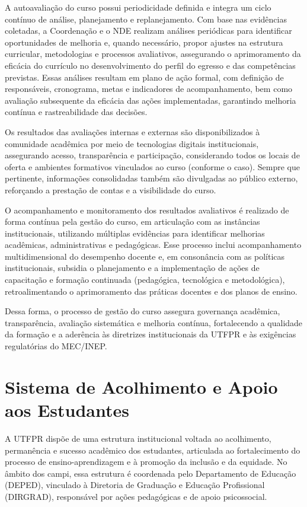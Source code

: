 A autoavaliação do curso possui periodicidade definida e integra um ciclo contínuo de análise, planejamento e replanejamento. Com base nas evidências coletadas, a Coordenação e o NDE realizam análises periódicas para identificar oportunidades de melhoria e, quando necessário, propor ajustes na estrutura curricular, metodologias e processos avaliativos, assegurando o aprimoramento da eficácia do currículo no desenvolvimento do perfil do egresso e das competências previstas. Essas análises resultam em plano de ação formal, com definição de responsáveis, cronograma, metas e indicadores de acompanhamento, bem como avaliação subsequente da eficácia das ações implementadas, garantindo melhoria contínua e rastreabilidade das decisões.

Os resultados das avaliações internas e externas são disponibilizados à comunidade acadêmica por meio de tecnologias digitais institucionais, assegurando acesso, transparência e participação, considerando todos os locais de oferta e ambientes formativos vinculados ao curso (conforme o caso). Sempre que pertinente, informações consolidadas também são divulgadas ao público externo, reforçando a prestação de contas e a visibilidade do curso.

O acompanhamento e monitoramento dos resultados avaliativos é realizado de forma contínua pela gestão do curso, em articulação com as instâncias institucionais, utilizando múltiplas evidências para identificar melhorias acadêmicas, administrativas e pedagógicas. Esse processo inclui acompanhamento multidimensional do desempenho docente e, em consonância com as políticas institucionais, subsidia o planejamento e a implementação de ações de capacitação e formação continuada (pedagógica, tecnológica e metodológica), retroalimentando o aprimoramento das práticas docentes e dos planos de ensino.

Dessa forma, o processo de gestão do curso assegura governança acadêmica, transparência, avaliação sistemática e melhoria contínua, fortalecendo a qualidade da formação e a aderência às diretrizes institucionais da UTFPR e às exigências regulatórias do MEC/INEP.

\section{Sistema de Acolhimento e Apoio aos Estudantes}

A UTFPR dispõe de uma estrutura institucional voltada ao acolhimento, permanência e sucesso acadêmico dos estudantes, articulada ao fortalecimento do processo de ensino-aprendizagem e à promoção da inclusão e da equidade. No âmbito dos campi, essa estrutura é coordenada pelo Departamento de Educação (DEPED), vinculado à Diretoria de Graduação e Educação Profissional (DIRGRAD), responsável por ações pedagógicas e de apoio psicossocial.

